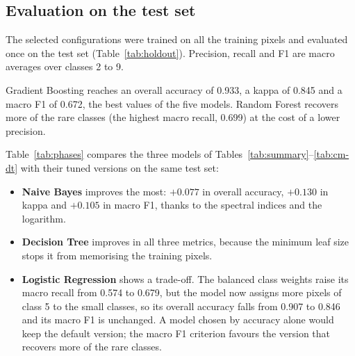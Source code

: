 \documentclass[11pt,a4paper]{article}
\begin{document}
\subsection{Evaluation on the test set}

The selected configurations were trained on all the training pixels and
evaluated once on the test set (Table~\ref{tab:holdout}). Precision, recall
and F1 are macro averages over classes 2 to 9.

\begin{table}[H]
\centering\footnotesize
\caption{Models with selected hyper-parameters on the test set (114,846
pixels).}
\label{tab:holdout}

\end{table}

Gradient Boosting reaches an overall accuracy of 0.933, a kappa of 0.845 and
a macro F1 of 0.672, the best values of the five models. Random Forest
recovers more of the rare classes (the highest macro recall, 0.699) at the
cost of a lower precision.

Table~\ref{tab:phases} compares the three models of
Tables~\ref{tab:summary}--\ref{tab:cm-dt} with their tuned versions on the
same test set:

\begin{itemize}
  \item \textbf{Naive Bayes} improves the most: $+0.077$ in overall accuracy,
  $+0.130$ in kappa and $+0.105$ in macro F1, thanks to the spectral indices
  and the logarithm.
  \item \textbf{Decision Tree} improves in all three metrics, because the
  minimum leaf size stops it from memorising the training pixels.
  \item \textbf{Logistic Regression} shows a trade-off. The balanced class
  weights raise its macro recall from 0.574 to 0.679, but the model now
  assigns more pixels of class 5 to the small classes, so its overall
  accuracy falls from 0.907 to 0.846 and its macro F1 is unchanged. A model
  chosen by accuracy alone would keep the default version; the macro F1
  criterion favours the version that recovers more of the rare classes.
\end{itemize}

\begin{table}[H]
\centering\footnotesize
\setlength{\tabcolsep}{4pt}
\caption{Default against selected hyper-parameters on the test set.}
\label{tab:phases}

\end{table}
\end{document}

